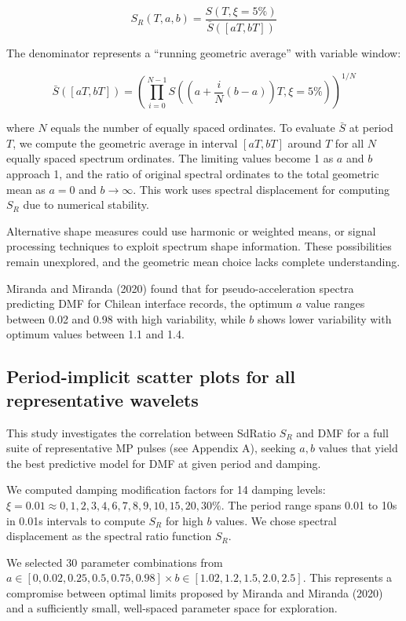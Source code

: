 \[S_R(T,a,b) = \frac{S(T,\xi = 5\%)}{\bar{S}([aT,bT])}\]

The denominator represents a ``running geometric average'' with variable
window:

\[\bar{S}([aT,bT]) = \left( \prod_{i = 0}^{N - 1} S\left( (a + \frac{i}{N}(b - a))T,\xi = 5\% \right) \right)^{1/N}\]

where \(N\) equals the number of equally spaced ordinates. To evaluate
\(\bar{S}\) at period \(T\), we compute the geometric average in
interval \([aT, bT]\) around \(T\) for all \(N\) equally spaced spectrum
ordinates. The limiting values become 1 as \(a\) and \(b\) approach 1,
and the ratio of original spectral ordinates to the total geometric mean
as \(a = 0\) and \(b \to \infty\). This work uses spectral displacement
for computing \(S_R\) due to numerical stability.

Alternative shape measures could use harmonic or weighted means, or
signal processing techniques to exploit spectrum shape information.
These possibilities remain unexplored, and the geometric mean choice
lacks complete understanding.

Miranda and Miranda (2020) found that for pseudo-acceleration spectra
predicting DMF for Chilean interface records, the optimum \(a\) value
ranges between 0.02 and 0.98 with high variability, while \(b\) shows
lower variability with optimum values between 1.1 and 1.4.

\subsection{Period-implicit scatter plots for all representative
wavelets}\label{period-implicit-scatter-plots-for-all-representative-wavelets}

This study investigates the correlation between SdRatio \(S_R\) and DMF
for a full suite of representative MP pulses (see Appendix A), seeking
\(a, b\) values that yield the best predictive model for DMF at given
period and damping.

We computed damping modification factors for 14 damping levels:
\(\xi = 0.01 \approx 0, 1, 2, 3, 4, 6, 7, 8, 9, 10, 15, 20, 30\%\). The
period range spans 0.01 to 10s in 0.01s intervals to compute \(S_R\) for
high \(b\) values. We chose spectral displacement as the spectral ratio
function \(S_R\).

We selected 30 parameter combinations from
\(a \in [0, 0.02, 0.25, 0.5, 0.75, 0.98] \times b \in [1.02, 1.2, 1.5, 2.0, 2.5]\).
This represents a compromise between optimal limits proposed by Miranda
and Miranda (2020) and a sufficiently small, well-spaced parameter space
for exploration.

